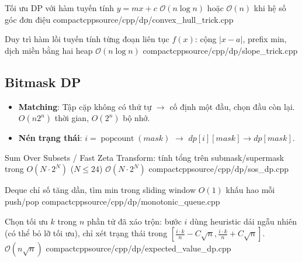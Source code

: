 {Tối ưu DP với hàm tuyến tính $y = mx + c$}
{$\mathcal{O}(n \log n)$ hoặc $\mathcal{O}(n)$ khi hệ số góc đơn điệu}
{compactcpp}{source/cpp/dp/convex_hull_trick.cpp}

{Duy trì hàm lồi tuyến tính từng đoạn liên tục $f(x)$: cộng $|x-a|$, prefix min, dịch miền bằng hai heap}
{$\mathcal{O}(n \log n)$}
{compactcpp}{source/cpp/dp/slope_trick.cpp}

\subsection{Bitmask DP}
\begin{itemize}
  \item \textbf{Matching}: Tập cặp không có thứ tự $\to$ cố định một đầu, chọn đầu còn lại. $O(n2^n)$ thời gian, $O(2^n)$ bộ nhớ.
  \item \textbf{Nén trạng thái}: $i=\operatorname{popcount}(mask)$ $\to$ $dp[i][mask]\to dp[mask]$.
\end{itemize}

{Sum Over Subsets / Fast Zeta Transform: tính tổng trên submask/supermask trong $O(N \cdot 2^N)$ ($N \le 24$)}
{$\mathcal{O}(N \cdot 2^N)$}
{compactcpp}{source/cpp/dp/sos_dp.cpp}

{Deque chỉ số tăng dần, tìm min trong sliding window}
{$O(1)$ khấu hao mỗi push/pop}
{compactcpp}{source/cpp/dp/monotonic_queue.cpp}

{Chọn tối ưu $k$ trong $n$ phần tử đã xáo trộn: bước $i$ dùng heuristic dải ngẫu nhiên (có thể bỏ lỡ tối ưu), chỉ xét trạng thái trong $\left[\frac{i \cdot k}{n} - C\sqrt{n}, \frac{i \cdot k}{n} + C\sqrt{n}\right]$.}
{$\mathcal{O}(n \sqrt{n})$}
{compactcpp}{source/cpp/dp/expected_value_dp.cpp}
